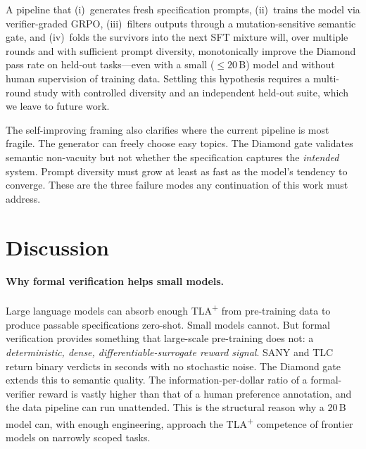 \documentclass[11pt]{article}
\begin{document}
\begin{tcolorbox}[
  enhanced, breakable,
  colback=cbox, colframe=cline, boxrule=0.5pt,
  arc=2pt, left=8pt, right=8pt, top=4pt, bottom=4pt,
  title=\textbf{Hypothesis (testable, not claimed here)},
  fonttitle=\small,
]
A pipeline that (i)~generates fresh specification prompts,
(ii)~trains the model via verifier-graded GRPO, (iii)~filters outputs
through a mutation-sensitive semantic gate, and (iv)~folds the
survivors into the next SFT mixture will, over multiple rounds and
with sufficient prompt diversity, monotonically improve the Diamond
pass rate on held-out tasks---even with a small ($\leq 20$\,B) model
and without human supervision of training data.  Settling this
hypothesis requires a multi-round study with controlled diversity
and an independent held-out suite, which we leave to future work.
\end{tcolorbox}

The self-improving framing also clarifies where the current pipeline
is most fragile.  The generator can freely choose easy topics.  The
Diamond gate validates semantic non-vacuity but not whether the
specification captures the \emph{intended} system.  Prompt diversity
must grow at least as fast as the model's tendency to converge.  These
are the three failure modes any continuation of this work must
address.

\section{Discussion}
\label{sec:discussion}

\paragraph{Why formal verification helps small models.}
Large language models can absorb enough TLA\textsuperscript{+} from
pre-training data to produce passable specifications zero-shot.
Small models cannot.  But formal verification provides something that
large-scale pre-training does not: a \emph{deterministic, dense,
differentiable-surrogate reward signal}.  SANY and TLC return binary
verdicts in seconds with no stochastic noise.  The Diamond gate
extends this to semantic quality.  The information-per-dollar ratio of
a formal-verifier reward is vastly higher than that of a human
preference annotation, and the data pipeline can run unattended.
This is the structural reason why a 20\,B model can, with enough
engineering, approach the TLA\textsuperscript{+} competence of
frontier models on narrowly scoped tasks.
\end{document}
